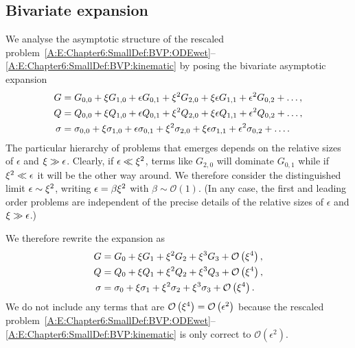 \begin{subappendices}
\subsection{Bivariate expansion}
We analyse the asymptotic structure of the rescaled problem~\eqref{A:E:Chapter6:SmallDef:BVP:ODEwet}--\eqref{A:E:Chapter6:SmallDef:BVP:kinematic} by posing the bivariate asymptotic expansion
\begin{align}
G &=  G_{0,0} + \xi G_{1,0} + \epsilon G_{0,1} +  \xi^2 G_{2,0} + \xi \epsilon G_{1,1} + \epsilon^2 G_{0,2} + \dots,\label{A:E:Chapter6:SmallDeformation:Expansion:ExpansionH} \\
Q &=  Q_{0,0} + \xi Q_{1,0} + \epsilon Q_{0,1} +  \xi^2 Q_{2,0} + \xi \epsilon Q_{1,1} + \epsilon^2 Q_{0,2} + \dots,\label{A:E:Chapter6:SmallDeformation:Expansion:ExpansionP} \\
\sigma &= \sigma_{0,0} + \xi \sigma_{1,0} + \epsilon \sigma_{0,1} +  \xi^2 \sigma_{2,0} + \xi \epsilon \sigma_{1,1} + \epsilon^2 \sigma_{0,2} + \dots. \label{A:E:Chapter6:SmallDeformation:Expansion:ExpansionSigma}
\end{align}
The particular hierarchy of problems that emerges depends on the relative sizes of $\epsilon$ and $\xi \gg \epsilon$. Clearly, if $\epsilon \ll \xi^2$, terms like $G_{2,0}$ will dominate $G_{0,1}$ while if $\xi^2 \ll \epsilon$ it will be the other way around. We therefore consider the distinguished limit $\epsilon \sim \xi^2$, writing $\epsilon = \beta \xi^2$ with $\beta \sim \mathcal{O}(1)$. (In any case, the first and leading order problems are independent of the precise details of the relative sizes of $\epsilon$ and $\xi \gg \epsilon$.)

We therefore rewrite the expansion as
\begin{align}
G &= G_0 + \xi G_1 + \xi^2 G_2 + \xi^3 G_3 + \mathcal{O}\left(\xi^4\right),\\
Q &= Q_0 + \xi Q_1 + \xi^2 Q_2 + \xi^3 Q_3 + \mathcal{O}\left(\xi^4\right),\label{A:E:SmallDef:Expansion:ExpansionQ}\\
\sigma &= \sigma_0 + \xi \sigma_1 + \xi^2 \sigma_2 + \xi^3 \sigma_3 + \mathcal{O}\left(\xi^4\right).
\end{align}
We do not include any terms that are $\mathcal{O}\left(\xi^4\right) = \mathcal{O}\left(\epsilon^2\right)$ because the rescaled problem~\eqref{A:E:Chapter6:SmallDef:BVP:ODEwet}--\eqref{A:E:Chapter6:SmallDef:BVP:kinematic} is only correct to $\mathcal{O}\left(\epsilon^2\right)$.


\end{subappendices}
